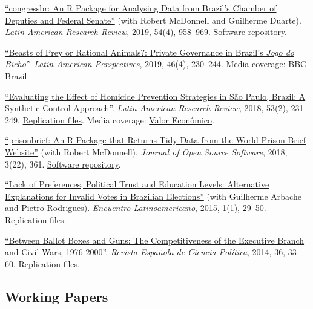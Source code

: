 \documentclass[a4paper]{article}
\renewenvironment{itemize}{
	\begin{list}{}{
			\setlength{\leftmargin}{1.5em}
		}
		}{
	\end{list}
}
\begin{document}
\begin{itemize}
\item \href{https://doi.org/10.25222/larr.447}{``congressbr: An R Package for Analysing Data from Brazil's Chamber of Deputies and Federal Senate''} (with Robert McDonnell and Guilherme Duarte). \textit{Latin American Research Review}, 2019, 54(4), 958--969. \href{https://github.com/duarteguilherme/congressbr}{Software repository}.
\item \href{https://doi.org/10.1177/0094582X19846519}{``Beasts of Prey or Rational Animals?: Private Governance in Brazil's \emph{Jogo do Bicho}''}. \textit{Latin American Perspectives}, 2019, 46(4), 230--244. Media coverage: \href{https://www.bbc.com/portuguese/brasil-40140693}{BBC Brazil}.
\item \href{https://doi.org/10.25222/larr.334}{``Evaluating the Effect of Homicide Prevention Strategies in São Paulo, Brazil: A Synthetic Control Approach''}. \textit{Latin American Research Review}, 2018, 53(2), 231--249. \href{https://github.com/danilofreire/homicides-sp-synth}{Replication files}. Media coverage: \href{https://www.valor.com.br/cultura/5111524/sangue-no-asfalto}{Valor Econômico}.
\item \href{https://doi.org/10.21105/joss.00361}{``prisonbrief: An R Package that Returns Tidy Data from the World Prison Brief Website''} (with Robert McDonnell). \textit{Journal of Open Source Software}, 2018, 3(22), 361. \href{https://github.com/danilofreire/prisonbrief}{Software repository}.
\item \href{http://www.iapss.org/wp-content/uploads/2014/10/ELA1.1_2.Lack-of-Preferences-Political-Trust-and-Education-Levels.pdf}{``Lack of Preferences, Political Trust and Education Levels: Alternative Explanations for Invalid Votes in Brazilian Elections''} (with Guilherme Arbache and Pietro Rodrigues). \textit{Encuentro Latinoamericano}, 2015, 1(1), 29--50. \href{https://github.com/danilofreire/invalid-votes-brazil}{Replication files}.
\item \href{https://recyt.fecyt.es/index.php/recp/article/view/37638}{``Between Ballot Boxes and Guns: The Competitiveness of the Executive Branch and Civil Wars, 1976-2000''}. \textit{Revista Española de Ciencia Política}, 2014, 36, 33--60. \href{https://doi.org/10.7910/DVN/NSDUYG}{Replication files}.
\end{itemize}

\subsection*{Working Papers}
\end{document}
